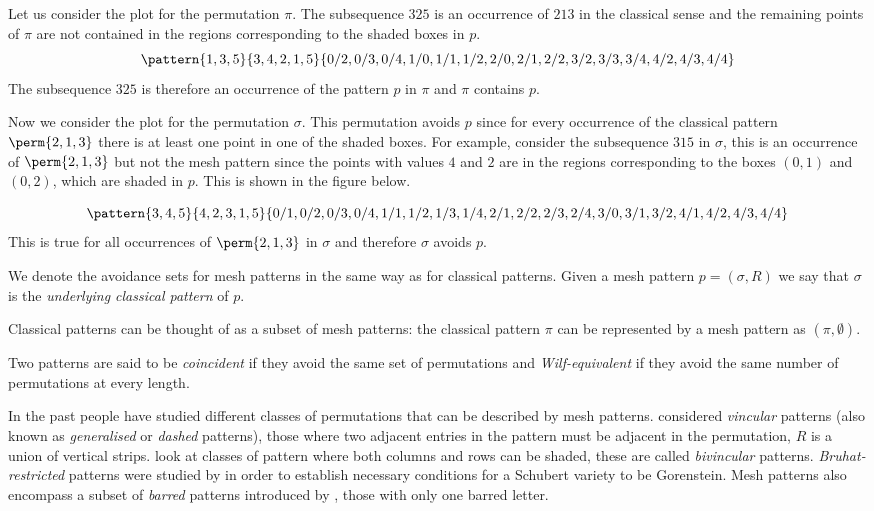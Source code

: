 Let us consider the plot for the permutation \(\pi\). The subsequence \(325\) is
an occurrence of \(213\) in the classical sense and the remaining points of \(\pi\)
are not contained in the regions corresponding to the shaded boxes in \(p\).
\begin{equation*}
    \pattern{1,3,5}{3,4,2,1,5}{0/2,0/3,0/4,
                               1/0,1/1,1/2,
                               2/0,2/1,2/2,
                               3/2,3/3,3/4,
                               4/2,4/3,4/4}
\end{equation*}
The subsequence \(325\) is therefore an occurrence of the pattern \(p\) in \(\pi\) and
\(\pi\) contains \(p\).

Now we consider the plot for the permutation \(\sigma\). This permutation
avoids \(p\) since for every occurrence of the classical pattern \(\perm{2,1,3}\)
there is at least one point in one of the shaded boxes. For example, consider the
subsequence \(315\) in \(\sigma\), this is an occurrence of \(\perm{2,1,3}\) but
not the mesh pattern since the points with values \(4\) and \(2\) are in the
regions corresponding to the boxes \((0,1)\) and \((0,2)\), which are shaded in
\(p\). This is shown in the figure below.

\begin{equation*}
    \pattern{3,4,5}{4,2,3,1,5}{0/1,0/2,0/3,0/4,
                               1/1,1/2,1/3,1/4,
                               2/1,2/2,2/3,2/4,
                               3/0,3/1,3/2,
                               4/1,4/2,4/3,4/4}
\end{equation*}
This is true for all occurrences of \(\perm{2,1,3}\) in \(\sigma\) and
therefore \(\sigma\) avoids \(p\).

We denote the avoidance sets for mesh patterns in the same way as for
classical patterns. Given a mesh pattern \(p=(\sigma,R)\) we say that \(\sigma\) is the \emph{underlying
classical pattern} of \(p\).
\begin{note}
    \label{not:classmesh}
    Classical patterns can be thought of as a subset of mesh patterns: the
    classical pattern \(\pi\) can be represented by a mesh pattern as
    \((\pi,\emptyset)\).
\end{note}

Two patterns are said to be \emph{coincident} if they avoid the same set of
permutations and \emph{Wilf-equivalent} if they avoid the same number of permutations
at every length.

In the past people have studied different classes
of permutations that can be described by mesh patterns. \textcite{babstein2000}
considered \emph{vincular} patterns (also known as \emph{generalised} or \emph{dashed} patterns),
those where two adjacent entries in the pattern must be adjacent in the permutation,
\ie \(R\) is a union of vertical strips.
\textcite{MR2652101} look at classes of pattern where both columns and rows
can be shaded, these are called \emph{bivincular} patterns.
\emph{Bruhat-restricted} patterns were studied by \textcite{MR2264071} in order
to establish necessary conditions for a Schubert variety to be Gorenstein.
Mesh patterns also encompass a subset of \emph{barred} patterns introduced by
\textcite{MR2716312}, those with only one barred letter.


